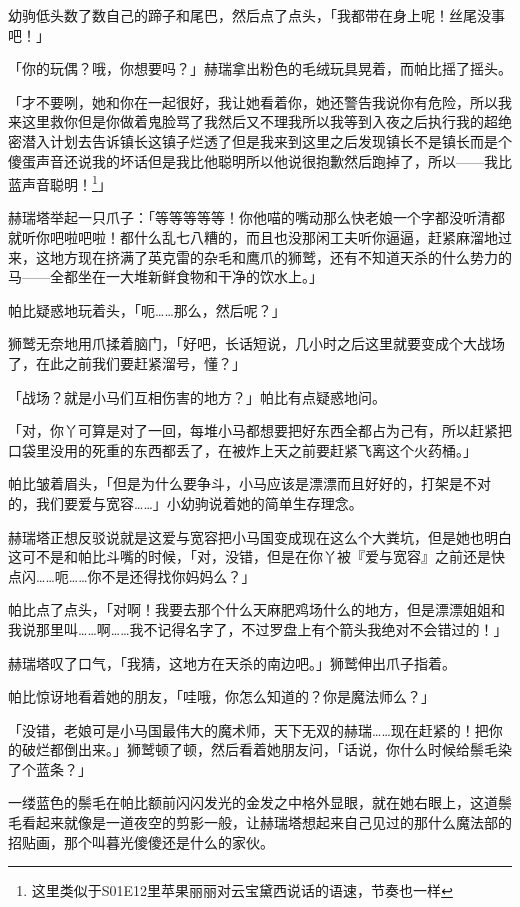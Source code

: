 幼驹低头数了数自己的蹄子和尾巴，然后点了点头，「我都带在身上呢！丝尾没事吧！」

「你的玩偶？哦，你想要吗？」赫瑞拿出粉色的毛绒玩具晃着，而帕比摇了摇头。

「才不要咧，她和你在一起很好，我让她看着你，她还警告我说你有危险，所以我来这里救你但是你做着鬼脸骂了我然后又不理我所以我等到入夜之后执行我的超绝密潜入计划去告诉镇长这镇子烂透了但是我来到这里之后发现镇长不是镇长而是个傻蛋声音还说我的坏话但是我比他聪明所以他说很抱歉然后跑掉了，所以——我比蓝声音聪明！\footnote{这里类似于S01E12里苹果丽丽对云宝黛西说话的语速，节奏也一样}」

赫瑞塔举起一只爪子：「等等等等等！你他喵的嘴动那么快老娘一个字都没听清都就听你吧啦吧啦！都什么乱七八糟的，而且也没那闲工夫听你逼逼，赶紧麻溜地过来，这地方现在挤满了英克雷的杂毛和鹰爪的狮鹫，还有不知道天杀的什么势力的马——全都坐在一大堆新鲜食物和干净的饮水上。」

帕比疑惑地玩着头，「呃……那么，然后呢？」

狮鹫无奈地用爪揉着脑门，「好吧，长话短说，几小时之后这里就要变成个大战场了，在此之前我们要赶紧溜号，懂？」

「战场？就是小马们互相伤害的地方？」帕比有点疑惑地问。

「对，你丫可算是对了一回，每堆小马都想要把好东西全都占为己有，所以赶紧把口袋里没用的死重的东西都丢了，在被炸上天之前要赶紧飞离这个火药桶。」

帕比皱着眉头，「但是为什么要争斗，小马应该是漂漂而且好好的，打架是不对的，我们要爱与宽容……」小幼驹说着她的简单生存理念。

赫瑞塔正想反驳说就是这爱与宽容把小马国变成现在这么个大粪坑，但是她也明白这可不是和帕比斗嘴的时候，「对，没错，但是在你丫被『爱与宽容』之前还是快点闪……呃……你不是还得找你妈妈么？」

帕比点了点头，「对啊！我要去那个什么天麻肥鸡场什么的地方，但是漂漂姐姐和我说那里叫……啊……我不记得名字了，不过罗盘上有个箭头我绝对不会错过的！」

赫瑞塔叹了口气，「我猜，这地方在天杀的南边吧。」狮鹫伸出爪子指着。

帕比惊讶地看着她的朋友，「哇哦，你怎么知道的？你是魔法师么？」

「没错，老娘可是小马国最伟大的魔术师，天下无双的赫瑞……现在赶紧的！把你的破烂都倒出来。」狮鹫顿了顿，然后看着她朋友问，「话说，你什么时候给鬃毛染了个蓝条？」

一缕蓝色的鬃毛在帕比额前闪闪发光的金发之中格外显眼，就在她右眼上，这道鬃毛看起来就像是一道夜空的剪影一般，让赫瑞塔想起来自己见过的那什么魔法部的招贴画，那个叫暮光傻傻还是什么的家伙。

